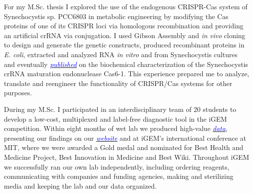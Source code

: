 \documentclass[11pt,a4paper,sans]{moderncv}
\begin{document}
\begin{spacing}{1.1}
For my M.Sc. thesis I explored the use of the endogenous CRISPR-Cas system of Synechocystis sp. PCC6803 in metabolic engineering by modifying the Cas proteins of one of its CRISPR loci via homologous recombination and providing an artificial crRNA via conjugation. 
I used Gibson Assembly and \textit{in vivo} cloning to design and generate the genetic constructs, produced recombinant proteins in \textit{E. coli}, extracted and analyzed RNA \textit{in vitro} and from Synechocystis cultures and eventually  {\href{https://www.tandfonline.com/eprint/vmAQ3vjYGdZIZpIKQTIT/full}{\textcolor{blue}{{\textit{published}}}}} on the biochemical characterization of the Synechocystis crRNA maturation endonuclease Cas6-1. 
This experience prepared me to analyze, translate and reengineer the functionality of CRISPR/Cas systems for other purposes. %
\par\vspace*{3mm}
During my M.Sc. I participated in an interdisciplinary team of 20 students to develop a low-cost, multiplexed and label-free diagnostic tool in the iGEM competition.
Within eight months of wet lab we produced high-value {\href{https://www.ncbi.nlm.nih.gov/pubmed/29803867}{\textcolor{blue}{\textit{data}}}}, presenting our findings on our 
{\href{http://2015.igem.org/Team:Freiburg/Home_Intro}{\textcolor{blue}{\textit{website}}}} and at iGEM's international conference at MIT, where we were awarded a Gold medal and nominated for Best Health and Medicine Project, Best Innovation in Medicine and Best Wiki.
Throughout iGEM we successfully ran our own lab independently, including ordering reagents, communicating with companies and funding agencies, making and sterilizing media and keeping the lab and our data organized. \par


\end{spacing}
\end{document}
